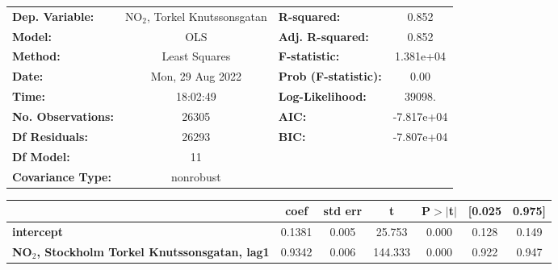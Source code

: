 \begin{landscape}
\begin{table}
\begin{center}
\begin{tabular}{lclc}
\toprule
\textbf{Dep. Variable:}                                   & NO$_2$, Torkel Knutssonsgatan & \textbf{  R-squared:         } &     0.852   \\
\textbf{Model:}                                           &               OLS                & \textbf{  Adj. R-squared:    } &     0.852   \\
\textbf{Method:}                                          &          Least Squares           & \textbf{  F-statistic:       } & 1.381e+04   \\
\textbf{Date:}                                            &         Mon, 29 Aug 2022         & \textbf{  Prob (F-statistic):} &     0.00    \\
\textbf{Time:}                                            &             18:02:49             & \textbf{  Log-Likelihood:    } &    39098.   \\
\textbf{No. Observations:}                                &               26305              & \textbf{  AIC:               } & -7.817e+04  \\
\textbf{Df Residuals:}                                    &               26293              & \textbf{  BIC:               } & -7.807e+04  \\
\textbf{Df Model:}                                        &                  11              & \textbf{                     } &             \\
\textbf{Covariance Type:}                                 &            nonrobust             & \textbf{                     } &             \\
\bottomrule
\end{tabular}
\begin{tabular}{lcccccc}
                                                          & \textbf{coef} & \textbf{std err} & \textbf{t} & \textbf{P$> |$t$|$} & \textbf{[0.025} & \textbf{0.975]}  \\
\midrule
\textbf{intercept}                                        &       0.1381  &        0.005     &    25.753  &         0.000        &        0.128    &        0.149     \\
\textbf{NO$_2$, Stockholm Torkel Knutssonsgatan, lag1} &       0.9342  &        0.006     &   144.333  &         0.000        &        0.922    &        0.947     \\

\end{tabular}
\end{center}
\end{table}
\end{landscape}
